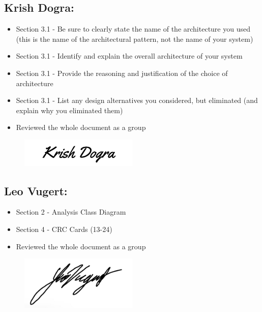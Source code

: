 \documentclass[]{article}
\begin{document}
\subsection*{Krish Dogra:}
\begin{itemize}
	\item Section 3.1 - Be sure to clearly state the name of the architecture you used (this is the name of the architectural
	      pattern, not the name of your system)
	\item Section 3.1 - Identify and explain the overall architecture of your system
	\item Section 3.1 - Provide the reasoning and justification of the choice of architecture
	\item Section 3.1 - List any design alternatives you considered, but eliminated (and explain why you eliminated them)
	\item Reviewed the whole document as a group
\end{itemize}
\begin{figure}[h]
	\centering
	\includegraphics[width=0.5\textwidth]{KrishSignature.jpg}
	\label{fig:signature}
\end{figure}


\subsection*{Leo Vugert:}
\begin{itemize}
	\item Section 2 - Analysis Class Diagram
	\item Section 4 - CRC Cards (13-24)
	\item Reviewed the whole document as a group
\end{itemize}
\begin{figure}[h]
	\centering
	\includegraphics[width=0.5\textwidth]{LeoSignature.jpg}
	\label{fig:signature}
\end{figure}
\end{document}
